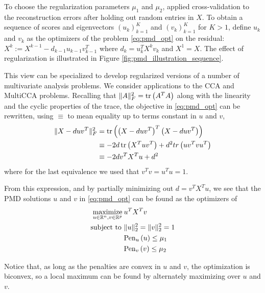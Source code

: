 \documentclass[14pt]{extarticle}
\begin{document}
To choose the regularization parameters $\mu_{1}$ and $\mu_{2}$,
\citep{witten2009penalized} applied cross-validation to the reconstruction
errors after holding out random entries in $X$. To obtain a sequence of scores
and eigenvectors $\left(u_{k}\right)_{k = 1}^{K}$ and $\left(v_{k}\right)_{k =
  1}^{K}$ for $K > 1$, define $u_{k}$ and $v_{k}$ as the optimizers of the
problem \ref{eq:pmd_opt} on the residual: $X^{k} := X^{k - 1} - d_{k - 1}u_{k -
  1}v_{k - 1}^{T}$ where $d_{k} = u_{k}^{T} X^{k}v_{k}$ and $X^{1} = X$.
The effect of regularization is illustrated in Figure
\ref{fig:pmd_illustration_sequence}.


This view can be specialized to develop regularized versions of a number of
multivariate analysis problems. We consider applications to the CCA and MultiCCA
problems. Recalling that $\|A\|_{F}^{2} = \mathop\mathrm{tr}\left(A^{T}A\right)$ along with the
linearity and the cyclic properties of the trace, the objective in
\ref{eq:pmd_opt} can be rewritten, using $\equiv$ to mean equality up to terms
constant in $u$ and $v$,
\begin{align*}
  \|X - duv^{T}\|_{F}^{2} &= \mathop\mathrm{tr}\left(\left(X -
      duv^{T}\right)^{T}\left(X - duv^{T}\right)\right) \\
  &\equiv -2d\mathop\mathrm{tr}\left(X^{T}uv^{T}\right) + d^{2}tr\left(uv^{T}vu^{T}\right) \\
  &\equiv -2d v^{T}X^{T}u + d^{2}
\end{align*}
where for the last equivalence we used that $v^{T}v = u^{T}u = 1$.

From this expression, and by partially minimizing out $d = v^{T}X^{T}u$, we see
that the PMD solutions $u$ and $v$ in \ref{eq:pmd_opt} can be found as the
optimizers of
\begin{align}
\label{eq:pmd_reform}  \mathop\mathrm{maximize}_{u \in \mathbb{R}^{n}, v \in \mathbb{R}^{p}} \medspace &u^{T}X^{T}v \\
  \text{subject to } &\|u\|_{2}^{2} = \|v\|_{2}^{2} = 1 \nonumber \\
  &\text{Pen}_{u}\left(u\right) \leq \mu_{1}\nonumber \\
  &\text{Pen}_{v}\left(v\right) \leq \mu_{2} \nonumber
\end{align}

Notice that, as long as the penalties are convex in $u$ and $v$, the
optimization is biconvex, so a local maximum can be found by
alternately maximizing over $u$ and $v$.
\end{document}
